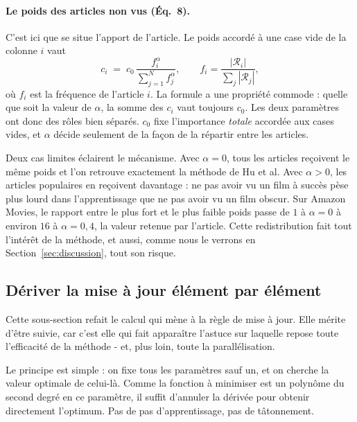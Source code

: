 \documentclass[11pt,a4paper]{article}
\begin{document}
\paragraph{Le poids des articles non vus (Éq.~8).} C'est ici que se situe l'apport de
l'article. Le poids accordé à une case vide de la colonne $i$ vaut
\begin{equation}\label{eq:ci}
c_i \;=\; c_0\,\frac{f_i^{\alpha}}{\sum_{j=1}^{N} f_j^{\alpha}},
\qquad f_i=\frac{|\mathcal{R}_i|}{\sum_{j}|\mathcal{R}_j|},
\end{equation}
où $f_i$ est la fréquence de l'article $i$. La formule a une propriété commode : quelle
que soit la valeur de $\alpha$, la somme des $c_i$ vaut toujours $c_0$. Les deux
paramètres ont donc des rôles bien séparés. $c_0$ fixe l'importance \emph{totale}
accordée aux cases vides, et $\alpha$ décide seulement de la façon de la répartir entre
les articles.

Deux cas limites éclairent le mécanisme. Avec $\alpha=0$, tous les articles reçoivent le
même poids et l'on retrouve exactement la méthode de Hu et al. Avec $\alpha>0$, les
articles populaires en reçoivent davantage : ne pas avoir vu un film à succès pèse plus
lourd dans l'apprentissage que ne pas avoir vu un film obscur. Sur Amazon Movies, le
rapport entre le plus fort et le plus faible poids passe de $1$ à $\alpha=0$ à environ
$16$ à $\alpha=0{,}4$, la valeur retenue par l'article. Cette redistribution fait tout
l'intérêt de la méthode, et aussi, comme nous le verrons en
Section~\ref{sec:discussion}, tout son risque.

\subsection{Dériver la mise à jour élément par élément}

Cette sous-section refait le calcul qui mène à la règle de mise à jour. Elle mérite
d'être suivie, car c'est elle qui fait apparaître l'astuce sur laquelle repose toute
l'efficacité de la méthode - et, plus loin, toute la parallélisation.

Le principe est simple : on fixe tous les paramètres sauf un, et on cherche la valeur
optimale de celui-là. Comme la fonction à minimiser est un polynôme du second degré en
ce paramètre, il suffit d'annuler la dérivée pour obtenir directement l'optimum. Pas de
pas d'apprentissage, pas de tâtonnement.
\end{document}
